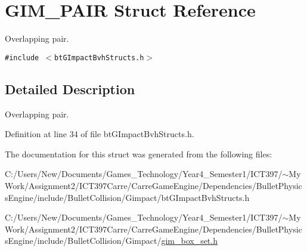 \hypertarget{struct_g_i_m___p_a_i_r}{
\section{GIM\_\-PAIR Struct Reference}
\label{struct_g_i_m___p_a_i_r}
}
Overlapping pair.  


{\tt \#include $<$btGImpactBvhStructs.h$>$}



\subsection{Detailed Description}
Overlapping pair. 

Definition at line 34 of file btGImpactBvhStructs.h.

The documentation for this struct was generated from the following files:\begin{CompactItemize}
\item 
C:/Users/New/Documents/Games\_\-Technology/Year4\_\-Semester1/ICT397/$\sim$My Work/Assignment2/ICT397Carre/CarreGameEngine/Dependencies/BulletPhysicsEngine/include/BulletCollision/Gimpact/btGImpactBvhStructs.h\item 
C:/Users/New/Documents/Games\_\-Technology/Year4\_\-Semester1/ICT397/$\sim$My Work/Assignment2/ICT397Carre/CarreGameEngine/Dependencies/BulletPhysicsEngine/include/BulletCollision/Gimpact/\hyperlink{gim__box__set_8h}{gim\_\-box\_\-set.h}\end{CompactItemize}
